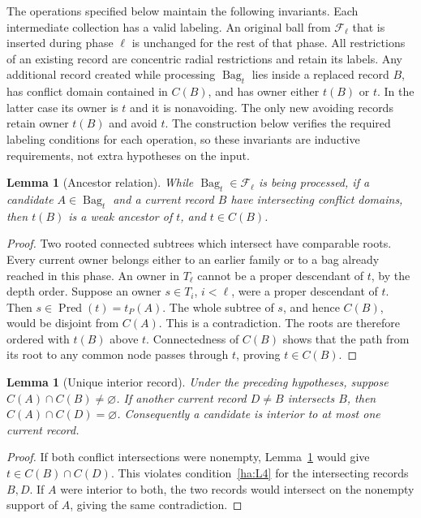 \documentclass[11pt]{amsart}
\newtheorem{lemma}[theorem]{Lemma}
\theoremstyle{definition}
\theoremstyle{remark}
\numberwithin{equation}{section}
\begin{document}
The operations specified below maintain the following invariants.
Each intermediate collection has a valid labeling.  An original
ball from $\mathcal F_\ell$ that is inserted during phase $\ell$
is unchanged for the rest of that phase.  All restrictions of an
existing record are concentric radial restrictions and retain its
labels.  Any additional record created while processing
$\operatorname{Bag}_t$ lies inside a replaced record $B$, has conflict
domain contained in $C(B)$, and has owner either $t(B)$ or $t$.
In the latter case its owner is $t$ and it is nonavoiding.  The only
new avoiding records retain owner $t(B)$ and avoid $t$.
The construction below verifies the required labeling conditions
for each operation, so these invariants are inductive requirements,
not extra hypotheses on the input.

\begin{lemma}[Ancestor relation]\label{ha:ancestor}
While $\operatorname{Bag}_t\in\mathcal F_\ell$ is being processed,
if a candidate $A\in\operatorname{Bag}_t$ and a current record $B$
have intersecting conflict domains, then $t(B)$ is a weak ancestor of
$t$, and $t\in C(B)$.
\end{lemma}
\begin{proof}
Two rooted connected subtrees which intersect have comparable roots.
Every current owner belongs either to an earlier family or to a bag
already reached in this phase.  An owner in $T_\ell$ cannot be a
proper descendant of $t$, by the depth order.  Suppose an owner
$s\in T_i$, $i<\ell$, were a proper descendant of $t$.  Then
$s\in\operatorname{Pred}(t)=t_P(A)$.
The whole subtree of $s$, and hence $C(B)$, would be disjoint
from $C(A)$.  This is a contradiction.  The roots are therefore
ordered with $t(B)$ above $t$.  Connectedness of $C(B)$ shows that
the path from its root to any common node passes through $t$, proving
$t\in C(B)$.
\end{proof}

\begin{lemma}[Unique interior record]\label{ha:unique-interior}
Under the preceding hypotheses, suppose $C(A)\cap C(B)\ne\varnothing$.
If another current record $D\ne B$ intersects $B$, then
$C(A)\cap C(D)=\varnothing$.  Consequently a candidate is interior
to at most one current record.
\end{lemma}
\begin{proof}
If both conflict intersections were nonempty,
Lemma~\ref{ha:ancestor} would give $t\in C(B)\cap C(D)$.
This violates condition~\ref{ha:L4} for the intersecting records
$B,D$.  If $A$ were interior to both, the two records would
intersect on the nonempty support of $A$, giving the same contradiction.
\end{proof}
\end{document}
